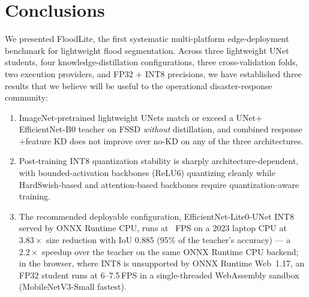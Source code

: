
\section{Conclusions}
\label{sec:conclusion}

We presented FloodLite, the first systematic multi-platform edge-deployment benchmark for lightweight flood segmentation. Across three lightweight UNet students, four knowledge-distillation configurations, three cross-validation folds, two execution providers, and FP32 $+$ INT8 precisions, we have established three results that we believe will be useful to the operational disaster-response community:

\begin{enumerate}
\item ImageNet-pretrained lightweight UNets match or exceed a UNet$+$EfficientNet-B0 teacher on FSSD \emph{without} distillation, and combined response$+$feature KD does not improve over no-KD on any of the three architectures.
\item Post-training INT8 quantization stability is sharply architecture-dependent, with bounded-activation backbones (ReLU6) quantizing cleanly while HardSwish-based and attention-based backbones require quantization-aware training.
\item The recommended deployable configuration, EfficientNet-Lite0-UNet INT8 served by ONNX Runtime CPU, runs at \deployableMTwoFPS~FPS on a 2023 laptop CPU at $3.83\times$ size reduction with IoU 0.885 (95\% of the teacher's accuracy) --- a $2.2\times$ speedup over the teacher on the same ONNX Runtime CPU backend; in the browser, where INT8 is unsupported by ONNX Runtime Web~1.17, an FP32 student runs at 6--7.5\,FPS in a single-threaded WebAssembly sandbox (MobileNetV3-Small fastest).
\end{enumerate}

